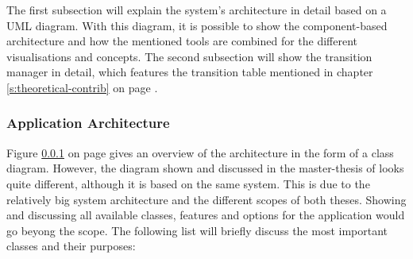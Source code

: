 The first subsection will explain the system's architecture in detail based on a \ac{UML} diagram. With this diagram, it is possible to show the component-based architecture and how the mentioned tools are combined for the different visualisations and concepts. The second subsection will show the transition manager in detail, which features the transition table mentioned in chapter \ref{s:theoretical-contrib} on page \pageref{s:theoretical-contrib}.



\subsubsection{Application Architecture}
Figure \ref{} on page \pageref{} gives an overview of the architecture in the form of a class diagram. However, the diagram shown and discussed in the master-thesis of \citeauthor{} looks quite different, although it is based on the same system. This is due to the relatively big system architecture and the different scopes of both theses. Showing and discussing all available classes, features and options for the application would go beyong the scope. The following list will briefly discuss the most important classes and their purposes:


